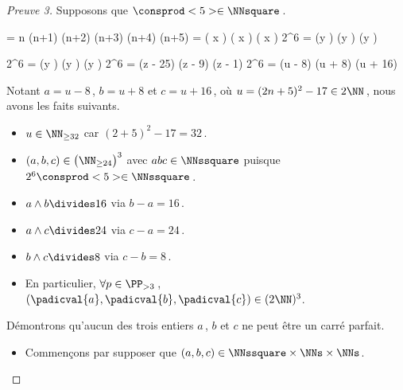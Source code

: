 \begin{proof}[Preuve 3]%
    Supposons que $\consprod<5> \in \NNsquare$\,.

    \medskip
    \begin{stepcalc}[style = ar*, ope = \iff]
    	 = 
			n (n+1) (n+2) (n+3) (n+4) (n+5)
    	\consprod<5> = 
			\big( x \pm {} \big) \big( x \pm {} \big) \big( x \pm {} \big) 
    	2^6 \consprod<5> = 
			(y ) (y ) (y )
    \end{stepcalc}
    
    \begin{stepcalc}[style = ar*, ope = \iff]
    	2^6 \consprod<5> = 
			(y ) (y ) (y )
    	2^6 \consprod<5> = 
			(z - 25) (z - 9) (z - 1) 
    	2^6 \consprod<5> = 
			(u - 8) (u + 8) (u + 16)
    \end{stepcalc}

    \medskip
    Notant $a = u - 8$\,, $b = u + 8$ et $c = u + 16$\,, où $u = (2 n + 5)^2 - 17 \in 2 \NN$\,, nous avons les faits suivants.
    
    \begin{itemize}
		\item $u \in \NN_{\geq 32}$ car $(2 + 5)^2 - 17 = 32$\,.

		\item $(a, b, c) \in \big( \NN_{\geq 24} \big)^3$ avec $abc \in \NNssquare$ puisque $2^6 \consprod<5> \in \NNssquare$\,.

		\item $a \wedge b \divides 16$ via $b - a = 16$\,.

		\item $a \wedge c \divides 24$ via $c - a = 24$\,.

		\item $b \wedge c \divides 8$  via $c - b = 8$\,.

		\item En particulier, 
		$\forall p \in \PP_{>3}$\,, 
		$(\padicval{a}, \padicval{b}, \padicval{c}) \in ( 2 \NN )^3$.
	\end{itemize}

	\medskip
	
	Démontrons qu'aucun des trois entiers $a$\,, $b$ et $c$ ne peut être un carré parfait.
	\begin{itemize}
		\medskip
		\item Commençons par supposer que $(a, b, c) \in \NNssquare \times \NNs \times \NNs$. 
		

\end{itemize}
\end{proof}
